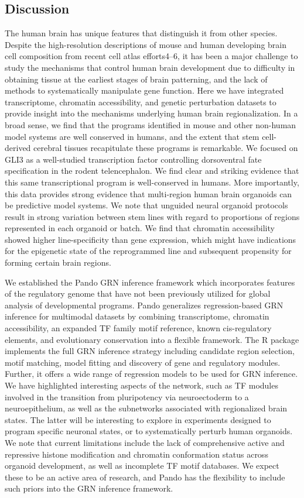 \subsection{Discussion}
The human brain has unique features that distinguish it from other species. Despite the high-resolution descriptions of mouse and human developing brain cell composition from recent cell atlas efforts4–6, it has been a major challenge to study the mechanisms that control human brain development due to difficulty in obtaining tissue at the earliest stages of brain patterning, and the lack of methods to systematically manipulate gene function. Here we have integrated transcriptome, chromatin accessibility, and genetic perturbation datasets to provide insight into the mechanisms underlying human brain regionalization. In a broad sense, we find that the programs identified in mouse and other non-human model systems are well conserved in humans, and the extent that stem cell-derived cerebral tissues recapitulate these programs is remarkable. We focused on GLI3 as a well-studied transcription factor controlling dorsoventral fate specification in the rodent telencephalon. We find clear and striking evidence that this same transcriptional program is well-conserved in humans. More importantly, this data provides strong evidence that multi-region human brain organoids can be predictive model systems. We note that unguided neural organoid protocols result in strong variation between stem lines with regard to proportions of regions represented in each organoid or batch. We find that chromatin accessibility showed higher line-specificity than gene expression, which might have indications for the epigenetic state of the reprogrammed line and subsequent propensity for forming certain brain regions.

We established the Pando GRN inference framework which incorporates features of the regulatory genome that have not been previously utilized for global analysis of developmental programs. Pando generalizes regression-based GRN inference for multimodal datasets by combining transcriptome, chromatin accessibility, an expanded TF family motif reference, known cis-regulatory elements, and evolutionary conservation into a flexible framework. The R package implements the full GRN inference strategy including candidate region selection, motif matching, model fitting and discovery of gene and regulatory modules. Further, it offers a wide range of regression models to be used for GRN inference. We have highlighted interesting aspects of the network, such as TF modules involved in the transition from pluripotency via neuroectoderm to a neuroepithelium, as well as the subnetworks associated with regionalized brain states. The latter will be interesting to explore in experiments designed to program specific neuronal states, or to systematically perturb human organoids. We note that current limitations include the lack of comprehensive active and repressive histone modification and chromatin conformation status across organoid development, as well as incomplete TF motif databases. We expect these to be an active area of research, and Pando has the flexibility to include such priors into the GRN inference framework.

